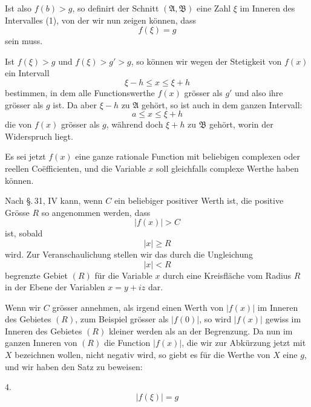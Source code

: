 
Ist also $f(b)>g$, so definirt der Schnitt $(\mathfrak A,\mathfrak B)$ eine Zahl $\xi$ im Inneren des Intervalles (1), von der wir nun zeigen können, dass
\begin{equation}
 f(\xi)=g
\tag{3}
\end{equation}
sein muss.

Ist $f(\xi)>g$ und $f(\xi)>g'>g$, so können wir wegen der Stetigkeit von $f(x)$ ein Intervall
\[
 \xi-h\le x\le \xi+h
\]
bestimmen, in dem alle Functionswerthe $f(x)$ grösser als $g'$ und also ihre  grösser als $g$ ist. Da aber $\xi-h$ zu $\mathfrak A$ gehört, so ist auch in dem ganzen Intervall:
\[
 a\le x\le \xi+h
\]
die  von $f(x)$ grösser als $g$, während doch $\xi+h$ zu $\mathfrak B$ gehört, worin der Widerspruch liegt.

Es sei jetzt $f(x)$ eine ganze rationale Function mit beliebigen complexen oder reellen Coëfficienten, und die Variable $x$ soll gleichfalls complexe Werthe haben können.

Nach \S.\,31, IV kann, wenn $C$ ein beliebiger positiver Werth ist, die positive Grösse $R$ so angenommen werden, dass
\begin{equation}
 |f(x)|>C
\tag{4}
\end{equation}
ist, sobald
\begin{equation}
 |x|\ge R
\tag{5}
\end{equation}
wird. Zur Veranschaulichung stellen wir das durch die Ungleichung
\[
 |x|<R
\]
begrenzte Gebiet $(R)$ für die Variable $x$ durch eine Kreisfläche vom Radius $R$ in der Ebene der Variablen $x=y+iz$ dar.

Wenn wir $C$ grösser annehmen, als irgend einen Werth von $|f(x)|$ im Inneren des Gebietes $(R)$, zum Beispiel grösser als $|f(0)|$, so wird $|f(x)|$ gewiss im Inneren des Gebietes $(R)$ kleiner werden als an der Begrenzung. Da nun im ganzen Inneren von $(R)$ die Function $|f(x)|$, die wir zur Abkürzung jetzt mit $X$ bezeichnen wollen, nicht negativ wird, so giebt es für die Werthe von $X$ eine  $g$, und wir haben den Satz zu beweisen:

4. 
\begin{equation}
 |f(\xi)|=g
\tag{6}
\end{equation}
